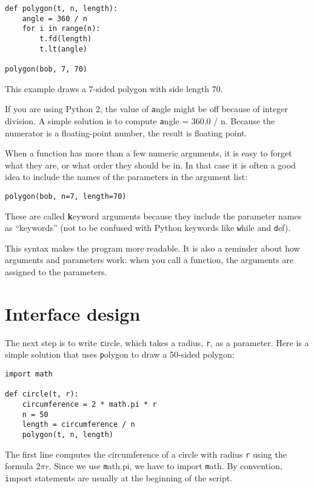 \documentclass[
DIV=11,
fontsize=12,
twoside,
headinclude=false,
titlepage=firstiscover,
abstract=true,
headsepline=true,
footsepline=true,
chapterprefix=true, %
headings=big,
bibliography=totoc,%
captions=tableheading
]{scrbook}
\theoremstyle{definition}
\begin{document}
\begin{lstlisting}
def polygon(t, n, length):
    angle = 360 / n
    for i in range(n):
        t.fd(length)
        t.lt(angle)

polygon(bob, 7, 70)
\end{lstlisting}
%
This example draws a 7-sided polygon with side length 70.

If you are using Python 2, the value of {\texttt angle} might be off
because of integer division.  A simple solution is to compute
{\texttt angle = 360.0 / n}.  Because the numerator is a floating-point
number, the result is floating point.

When a function has more than a few numeric arguments, it is easy to
forget what they are, or what order they should be in.  In that case
it is often a good idea to include the names of the parameters in the
argument list:

\begin{lstlisting}
polygon(bob, n=7, length=70)
\end{lstlisting}
%
These are called {\textbf keyword arguments} because they include
the parameter names as ``keywords'' (not to be confused with
Python keywords like {\texttt while} and {\texttt def}).

This syntax makes the program more readable.  It is also a reminder
about how arguments and parameters work: when you call a function, the
arguments are assigned to the parameters.


\section{Interface design}

The next step is to write {\texttt circle}, which takes a radius,
{\texttt r}, as a parameter.  Here is a simple solution that uses
{\texttt polygon} to draw a 50-sided polygon:

\begin{lstlisting}
import math

def circle(t, r):
    circumference = 2 * math.pi * r
    n = 50
    length = circumference / n
    polygon(t, n, length)
\end{lstlisting}
%
The first line computes the circumference of a circle with radius
{\texttt r} using the formula $2 \pi r$.  Since we use {\texttt math.pi}, we
have to import {\texttt math}.  By convention, {\texttt import} statements
are usually at the beginning of the script.
\end{document}
